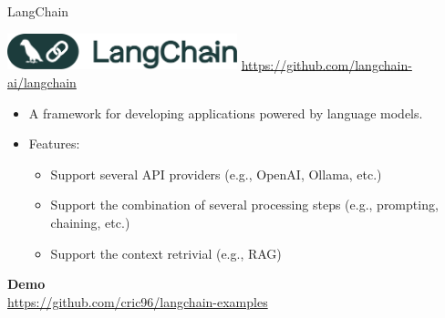 \documentclass[presentation, 10pt]{beamer}\mode<presentation>{\usetheme{AMSBolognaFC}}
\begin{document}
\begin{frame}{LangChain}
\begin{center}
\includegraphics[width=0.5\textwidth]{img/logo.png}
\url{https://github.com/langchain-ai/langchain}
\end{center}
\begin{itemize}
	\item A framework for developing applications powered by language models.
	\item Features:	
	\begin{itemize}
		\item Support several API providers (e.g., OpenAI, Ollama, etc.)
		\item Support the combination of several processing steps (e.g., prompting, chaining, etc.)
		\item Support the context retrivial (e.g., RAG)
	\end{itemize}
\end{itemize}
\begin{center}
\huge{\textbf{Demo}}\\
\small{\url{https://github.com/cric96/langchain-examples}}
\end{center}
\end{frame}
\end{document}
